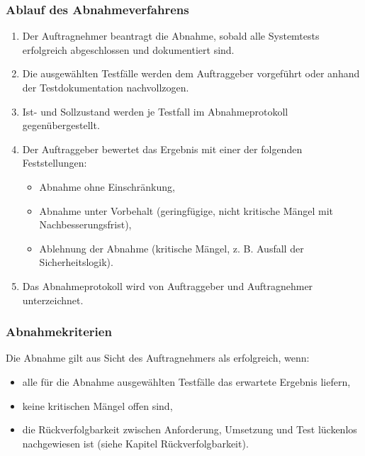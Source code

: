 \documentclass[
  a4paper,
  12pt,
  DIV=12,        %
  parskip=half,  %
  headings=small %
]{scrartcl}
\theoremstyle{definition}
\providecommand{\tightlist}{%
  \setlength{\itemsep}{0pt}\setlength{\parskip}{0pt}}
\theoremstyle{definition}
\begin{document}
\subsubsection{Ablauf des
Abnahmeverfahrens}\label{ablauf-des-abnahmeverfahrens}

\begin{enumerate}
\def\labelenumi{\arabic{enumi}.}
\tightlist
\item
  Der Auftragnehmer beantragt die Abnahme, sobald alle Systemtests
  erfolgreich abgeschlossen und dokumentiert sind.
\item
  Die ausgewählten Testfälle werden dem Auftraggeber vorgeführt oder
  anhand der Testdokumentation nachvollzogen.
\item
  Ist- und Sollzustand werden je Testfall im Abnahmeprotokoll
  gegenübergestellt.
\item
  Der Auftraggeber bewertet das Ergebnis mit einer der folgenden
  Feststellungen:

  \begin{itemize}
  \tightlist
  \item
    Abnahme ohne Einschränkung,
  \item
    Abnahme unter Vorbehalt (geringfügige, nicht kritische Mängel mit
    Nachbesserungsfrist),
  \item
    Ablehnung der Abnahme (kritische Mängel, z. B. Ausfall der
    Sicherheitslogik).
  \end{itemize}
\item
  Das Abnahmeprotokoll wird von Auftraggeber und Auftragnehmer
  unterzeichnet.
\end{enumerate}

\subsubsection{Abnahmekriterien}\label{abnahmekriterien}

Die Abnahme gilt aus Sicht des Auftragnehmers als erfolgreich, wenn:

\begin{itemize}
\tightlist
\item
  alle für die Abnahme ausgewählten Testfälle das erwartete Ergebnis
  liefern,
\item
  keine kritischen Mängel offen sind,
\item
  die Rückverfolgbarkeit zwischen Anforderung, Umsetzung und Test
  lückenlos nachgewiesen ist (siehe Kapitel Rückverfolgbarkeit).
\end{itemize}
\end{document}
